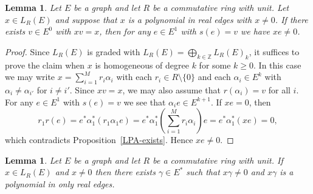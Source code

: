 \documentclass[11pt]{amsart}
\newtheorem{lemma}[theorem]{Lemma}
\theoremstyle{remark}
\numberwithin{equation}{section}
\newcommand{\Z}{\mathbb{Z}}
\begin{document}
\begin{lemma} \label{xe-not-zero-lem}
Let $E$ be a graph and let $R$ be a commutative ring with unit.  Let $x \in L_R(E)$ and suppose that $x$ is a polynomial in real edges with $x \neq 0$.  If there exists $v \in E^0$ with $xv = x$, then for any $e \in E^1$ with $s(e) = v$ we have $xe \neq 0$.
\end{lemma}

\begin{proof}
Since $L_R(E)$ is graded with $L_R(E) = \bigoplus_{k \in \Z} L_R(E)_k$, it suffices to prove the claim when $x$ is homogeneous of degree $k$ for some $k \geq 0$.  In this case we may write $x = \sum_{i=1}^M r_i \alpha_i$ with each $r_i \in R \setminus \{ 0 \}$ and each $\alpha_i \in E^k$ with $\alpha_i \neq \alpha_{i'}$ for $i \neq i'$.  Since $xv = x$, we may also assume that $r(\alpha_i) = v$ for all $i$.  For any $e \in E^1$ with $s(e) = v$ we see that $\alpha_i e \in E^{k+1}$.  If $xe = 0$, then $$r_1 r(e) = e^* \alpha_1^* (r_1 \alpha_1 e) = e^* \alpha_1^* \left( \sum_{i=1}^M r_i \alpha_i \right) e = e^* \alpha_1^* (xe) = 0,$$ which contradicts Proposition~\ref{LPA-exists}.  Hence $xe \neq 0$.
\end{proof}


\begin{lemma} \label{shift-to-real-lem}
Let $E$ be a graph and let $R$ be a commutative ring with unit.  If $x \in L_R(E)$ and $x \neq 0$ then there exists $\gamma \in E^*$ such that $x \gamma \neq 0$ and $x \gamma$ is a polynomial in only real edges.
\end{lemma}
\end{document}

